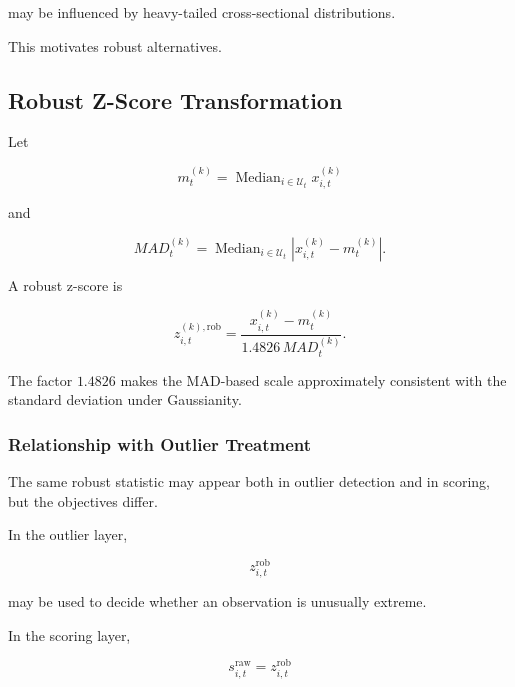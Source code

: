 \documentclass[11pt,a4paper]{article}
\begin{document}
may be influenced by heavy-tailed cross-sectional distributions.

This motivates robust alternatives.


\subsection{Robust Z-Score Transformation}
\label{subsec:raw_score_robust_z}

Let

\begin{equation}
m_t^{(k)}
=
\operatorname{Median}_{i\in\mathcal{U}_t}
x_{i,t}^{(k)}
\end{equation}

and

\begin{equation}
MAD_t^{(k)}
=
\operatorname{Median}_{i\in\mathcal{U}_t}
\left|
x_{i,t}^{(k)}
-
m_t^{(k)}
\right|.
\end{equation}

A robust z-score is

\begin{equation}
\boxed{
z_{i,t}^{(k),\mathrm{rob}}
=
\frac{
x_{i,t}^{(k)}
-
m_t^{(k)}
}{
1.4826\,MAD_t^{(k)}
}.
}
\end{equation}

The factor $1.4826$ makes the MAD-based scale approximately consistent with
the standard deviation under Gaussianity.


\subsubsection{Relationship with Outlier Treatment}

The same robust statistic may appear both in outlier detection and in scoring,
but the objectives differ.

In the outlier layer,

\begin{equation}
z_{i,t}^{\mathrm{rob}}
\end{equation}

may be used to decide whether an observation is unusually extreme.

In the scoring layer,

\begin{equation}
\boxed{
s_{i,t}^{\mathrm{raw}}
=
z_{i,t}^{\mathrm{rob}}
}
\end{equation}
\end{document}

